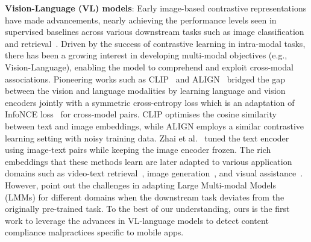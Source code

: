 \noindent\textbf{Vision-Language (VL) models}:  Early image-based contrastive representations have made advancements, nearly achieving the performance levels seen in supervised baselines across various downstream tasks such as image classification and retrieval~\cite{chen2020simple, zbontar2021barlow}. Driven by the success of contrastive learning in intra-modal tasks, there has been a growing interest in developing multi-modal objectives (e.g., Vision-Language), enabling the model to comprehend and exploit cross-modal associations.
Pioneering works such as CLIP~\cite{clip} and ALIGN~\cite{align} bridged the gap between the vision and language modalities by learning language and vision encoders jointly with a symmetric cross-entropy loss which is an adaptation of InfoNCE loss~\cite{oord2018representation} for cross-model pairs. CLIP optimises the cosine similarity between text and image embeddings, while ALIGN employs a similar contrastive learning setting with noisy training data. Zhai et al.~\cite{LiT} tuned the text encoder using image-text pairs while keeping the image encoder frozen. The rich embeddings that these methods learn are later adapted to various application domains such as video-text retrieval~\cite{fang2021clip2video, portillo2021straightforward}, image generation~\cite{nichol2021glide}, and visual assistance~\cite{massiceti2023explaining}. 
However, \cite{agarwal2021evaluating, luccioni2024stable} point out the challenges in adapting Large Multi-modal Models (LMMs) for different domains when the downstream task deviates from the originally pre-trained task. To the best of our understanding, ours is the first work to leverage the advances in VL-language models to detect content compliance malpractices specific to mobile apps. 

